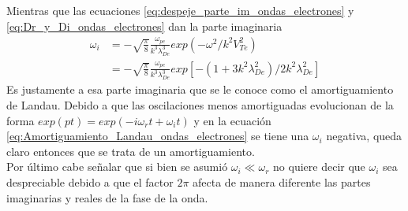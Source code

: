 \documentclass[../tesis_main_file.tex]{subfiles}
\begin{document}
Mientras que las ecuaciones \ref{eq:despeje_parte_im_ondas_electrones} y \ref{eq:Dr_y_Di_ondas_electrones} dan la parte imaginaria
\begin{equation}
\label{eq:Amortiguamiento_Landau_ondas_electrones}
\begin{split}
\omega_i &=-\sqrt{\frac{\pi}{8}}\frac{\omega_{pe}}{k^3\lambda^3_{De}}exp(-\omega^2/k^2V^2_{Te})\\
&=-\sqrt{\frac{\pi}{8}}\frac{\omega_{pe}}{k^3\lambda^3_{De}}exp\left[-(1+3k^2\lambda^2_{De})/2k^2\lambda^2_{De}\right]
\end{split}
\end{equation}
Es justamente a esa parte imaginaria que se le conoce como el amortiguamiento de Landau. Debido a que las oscilaciones menos amortiguadas evolucionan de la forma $exp(pt)=exp(-i\omega_rt+\omega_it)$ y en la ecuación \ref{eq:Amortiguamiento_Landau_ondas_electrones} se tiene una $\omega_i$ negativa, queda claro entonces que se trata de un amortiguamiento.\\
Por último cabe señalar que si bien se asumió $\omega_i \ll \omega_r$ no quiere decir que $\omega_i$ sea despreciable debido a que el factor $2\pi$ afecta de manera diferente las partes imaginarias y reales de la fase de la onda.
\end{document}
